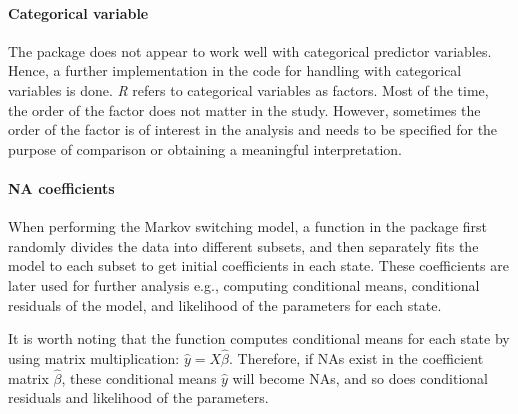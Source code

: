 \paragraph*{Categorical variable}

The package does not appear to work well with categorical predictor
variables. Hence, a further implementation in the code for handling
with categorical variables is done. \emph{R} refers to categorical
variables as factors. Most of the time, the order of the factor does
not matter in the study. However, sometimes the order of the factor
is of interest in the analysis and needs to be specified for the purpose
of comparison or obtaining a meaningful interpretation. 

\paragraph*{NA coefficients}

When performing the Markov switching model, a function in the package
first randomly divides the data into different subsets, and then separately
fits the model to each subset to get initial coefficients in each
state. These coefficients are later used for further analysis e.g.,
computing conditional means, conditional residuals of the model, and
likelihood of the parameters for each state.

It is worth noting that the function computes conditional means for
each state by using matrix multiplication: $\ensuremath{\hat{y}=X\hat{\beta}}$.
Therefore, if NAs exist in the coefficient matrix $\hat{\beta}$,
these conditional means $\hat{y}$ will become NAs, and so does conditional
residuals and likelihood of the parameters.

